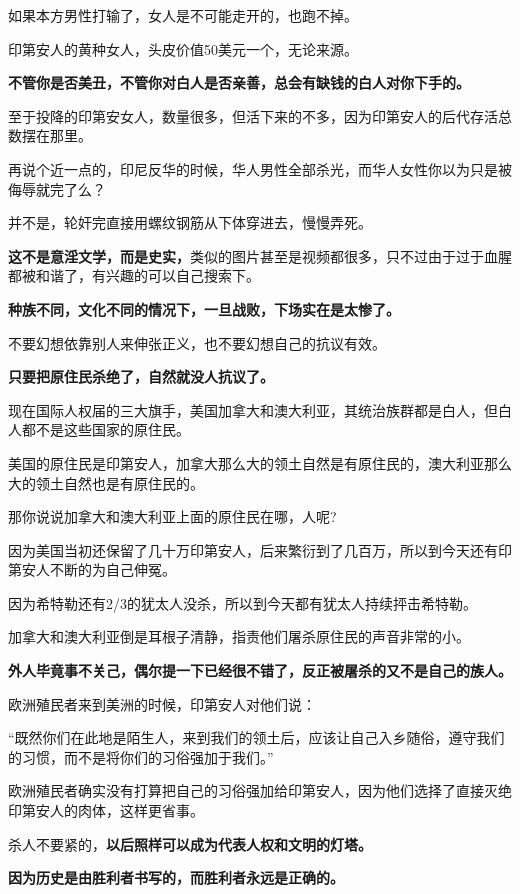\documentclass[UTF8, 11pt, oneside]{ctexart}
\newcommand{\zd}[1]{\textbf{\textcolor[RGB]{123,12,0}{#1}}} %
\newcommand{\yh}[1]{%
    \begin{tcolorbox}[enhanced,
        frame hidden, interior hidden,
        before skip = 5mm, left skip=10mm,
        borderline west={5pt}{0pt}{gray!50}]
        #1
    \end{tcolorbox}
}
\begin{document}
如果本方男性打输了，女人是不可能走开的，也跑不掉。

印第安人的黄种女人，头皮价值50美元一个，无论来源。

\zd{不管你是否美丑，不管你对白人是否亲善，总会有缺钱的白人对你下手的。}

至于投降的印第安女人，数量很多，但活下来的不多，因为印第安人的后代存活总数摆在那里。

再说个近一点的，印尼反华的时候，华人男性全部杀光，而华人女性你以为只是被侮辱就完了么？

并不是，轮奸完直接用螺纹钢筋从下体穿进去，慢慢弄死。

\zd{这不是意淫文学，而是史实，}类似的图片甚至是视频都很多，只不过由于过于血腥都被和谐了，有兴趣的可以自己搜索下。

\zd{种族不同，文化不同的情况下，一旦战败，下场实在是太惨了。}

不要幻想依靠别人来伸张正义，也不要幻想自己的抗议有效。

\zd{只要把原住民杀绝了，自然就没人抗议了。}

现在国际人权届的三大旗手，美国加拿大和澳大利亚，其统治族群都是白人，但白人都不是这些国家的原住民。

美国的原住民是印第安人，加拿大那么大的领土自然是有原住民的，澳大利亚那么大的领土自然也是有原住民的。

那你说说加拿大和澳大利亚上面的原住民在哪，人呢?

因为美国当初还保留了几十万印第安人，后来繁衍到了几百万，所以到今天还有印第安人不断的为自己伸冤。

因为希特勒还有2/3的犹太人没杀，所以到今天都有犹太人持续抨击希特勒。

加拿大和澳大利亚倒是耳根子清静，指责他们屠杀原住民的声音非常的小。

\zd{外人毕竟事不关己，偶尔提一下已经很不错了，反正被屠杀的又不是自己的族人。}

欧洲殖民者来到美洲的时候，印第安人对他们说：

\yh{
    “既然你们在此地是陌生人，来到我们的领土后，应该让自己入乡随俗，遵守我们的习惯，而不是将你们的习俗强加于我们。”
}

欧洲殖民者确实没有打算把自己的习俗强加给印第安人，因为他们选择了直接灭绝印第安人的肉体，这样更省事。

杀人不要紧的，\zd{以后照样可以成为代表人权和文明的灯塔。}

\zd{因为历史是由胜利者书写的，而胜利者永远是正确的。 }
\end{document}
